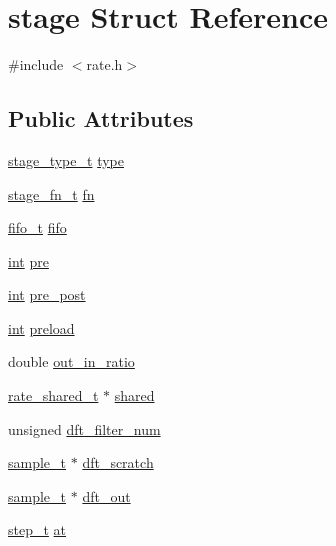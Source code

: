 \hypertarget{structstage}{}\section{stage Struct Reference}
\label{structstage}


{\ttfamily \#include $<$rate.\+h$>$}

\subsection*{Public Attributes}
\begin{DoxyCompactItemize}
\item 
\hyperlink{rate_8h_ad524e72d21e81fd57c0eb91a234d6c64}{stage\+\_\+type\+\_\+t} \hyperlink{structstage_a4b8533d9285ccfa210c90d6c5c755d04}{type}
\item 
\hyperlink{rate_8h_a59221c24235975480a4d5f8ff1e781e5}{stage\+\_\+fn\+\_\+t} \hyperlink{structstage_a100b125aca7f84217a26ca251b23374c}{fn}
\item 
\hyperlink{structfifo__t}{fifo\+\_\+t} \hyperlink{structstage_aa051357fcd85b5303204529fe474f68b}{fifo}
\item 
\hyperlink{xmltok_8h_a5a0d4a5641ce434f1d23533f2b2e6653}{int} \hyperlink{structstage_a6ed0d8c8c6b9ac194988a2597118f0c2}{pre}
\item 
\hyperlink{xmltok_8h_a5a0d4a5641ce434f1d23533f2b2e6653}{int} \hyperlink{structstage_afc665050a65a6a1e6342270577cd404e}{pre\+\_\+post}
\item 
\hyperlink{xmltok_8h_a5a0d4a5641ce434f1d23533f2b2e6653}{int} \hyperlink{structstage_a10b3cd32ce6ccf0386610f7b3fab415c}{preload}
\item 
double \hyperlink{structstage_a7f6ab977daaec780e4788323fd32503b}{out\+\_\+in\+\_\+ratio}
\item 
\hyperlink{structrate__shared__t}{rate\+\_\+shared\+\_\+t} $\ast$ \hyperlink{structstage_a07bca553ab88e98bf45e59c2a44119c8}{shared}
\item 
unsigned \hyperlink{structstage_a57ec3f95768d18cf2e9ba23e604f65f5}{dft\+\_\+filter\+\_\+num}
\item 
\hyperlink{soxr_8c_aeef50d4abead1cb3eef063fda4b721c0}{sample\+\_\+t} $\ast$ \hyperlink{structstage_af13ba0f02757fdc29e6d4a6cb493aed4}{dft\+\_\+scratch}
\item 
\hyperlink{soxr_8c_aeef50d4abead1cb3eef063fda4b721c0}{sample\+\_\+t} $\ast$ \hyperlink{structstage_a05610101ba9d584999f8b47860cd2baa}{dft\+\_\+out}
\item 
\hyperlink{unionstep__t}{step\+\_\+t} \hyperlink{structstage_af270461827df216ffa9e0737886bc646}{at}

\end{DoxyCompactItemize}
